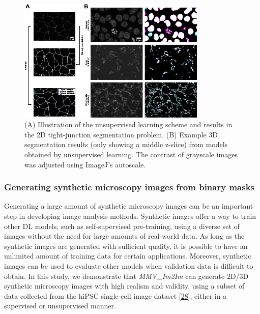 \begin{figure}
\hypertarget{fig:unsupervised}{%
\centering
\includegraphics[width=0.8\textwidth,height=\textheight]{images/unsupervised_seg_justin.png}
\caption{(A) Illustration of the unsupervised learning scheme and results in the 2D tight-junction segmentation problem. (B) Example 3D segmentation results (only showing a middle z-slice) from models obtained by unsupervised learning. The contrast of grayscale images was adjusted using ImageJ's autoscale.}\label{fig:unsupervised}
}
\end{figure}

\hypertarget{generating-synthetic-microscopy-images-from-binary-masks}{%
\subsubsection{Generating synthetic microscopy images from binary masks}\label{generating-synthetic-microscopy-images-from-binary-masks}}

Generating a large amount of synthetic microscopy images can be an important step in developing image analysis methods. Synthetic images offer a way to train other DL models, such as self-supervised pre-training, using a diverse set of images without the need for large amounts of real-world data. As long as the synthetic images are generated with sufficient quality, it is possible to have an unlimited amount of training data for certain applications. Moreover, synthetic images can be used to evaluate other models when validation data is difficult to obtain. In this study, we demonstrate that \emph{MMV\_Im2Im} can generate 2D/3D synthetic microscopy images with high realism and validity, using a subset of data collected from the hiPSC single-cell image dataset {[}\protect\hyperlink{ref-5sGcmDuy}{28}{]}, either in a supervised or unsupervised manner.

